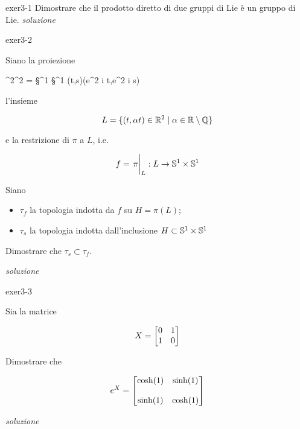 {exer3-1}
{
Dimostrare che il prodotto diretto di due gruppi di Lie è un gruppo di Lie.
}
{
\textit{soluzione}
}


{exer3-2}
{
Siano la proiezione

\map{\pi}
	{\R^{2}}{\T^{2} = \S^{1} \times \S^{1}}
	{(t,s)}{(e^{2 \pi i t},e^{2 \pi i s})}

l'insieme

\begin{equation}
	L = \{ (t,\alpha t) \in \R^{2} \mid \alpha \in \R \setminus \Q \}
\end{equation}

e la restrizione di $ \pi $ a $ L $, i.e.

\begin{equation}
	f = \eval{\pi}_{L} : L \to \S^{1} \times \S^{1}
\end{equation}

Siano

\begin{itemize}
	\item $ \tau_{f} $ la topologia indotta da $ f $ su $ H = \pi(L) $;
	
	\item $ \tau_{s} $ la topologia indotta dall'inclusione $ H \subset \S^{1} \times \S^{1} $
\end{itemize}

Dimostrare che $ \tau_{s} \subset \tau_{f} $.
}
{
\textit{soluzione}
}


{exer3-3}
{
Sia la matrice

\begin{equation}
	X = \bmqty{ %
				0 & 1 \\
				1 & 0 %
				}
\end{equation}

Dimostrare che

\begin{equation}
	e^{X} = \bmqty{ %
					\cosh(1) & \sinh(1) \\ \\
					\sinh(1) & \cosh(1) %
					}
\end{equation}
}
{
\textit{soluzione}
}


